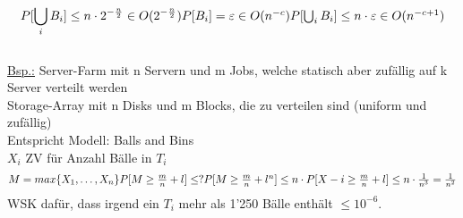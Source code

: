 \documentclass{article}
\begin{document}
	\[
	P[\bigcup_i B_i] \leq n \cdot 2^{-\frac{n}{2}} \in O( 2^{-\frac{n}{2}}) $$ $$
	P[B_i] = \varepsilon \in O(n^{-c}) $$ $$
	P[\bigcup_i B_i]  \leq n \cdot \varepsilon \in O(n^{-c+1})
	\]
	\newpage 
	\hfill \\
	\underline{Bsp.:} Server-Farm mit n Servern und m Jobs, welche statisch aber zufällig auf k Server verteilt werden \\
	Storage-Array mit n Disks und m Blocks, die zu verteilen sind (uniform und zufällig) \\
	Entspricht Modell: Balls and Bins \\
	$X_i$ ZV für Anzahl Bälle in $T_i$ \\
	\[
	M = max\{ X_1, \ldots, X_n\} $$ $$
	P[M\geq \frac{m}{n} + l] \leq ? $$ $$
	P[M \geq \frac{m}{n}	+ l^n] \leq n \cdot P[X-i \geq \frac{m}{n} + l] \leq n \cdot \frac{1}{n^3} = \frac{1}{n^2}
	\]
	WSK dafür, dass irgend ein $T_i$ mehr als 1'250 Bälle enthält $\leq 10^{-6}$.
	
	
	
\end{document}
